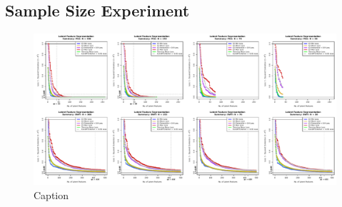 \subsection{Sample Size Experiment}\label{sec:sample-size-experiment}


\begin{figure}
    \centering
    \includegraphics[width=1\linewidth]{figures/eye-sample-size-results-results-01.pdf}
    \caption{Caption}
    \label{fig:eye-sample-size-results-results-01}
\end{figure}


